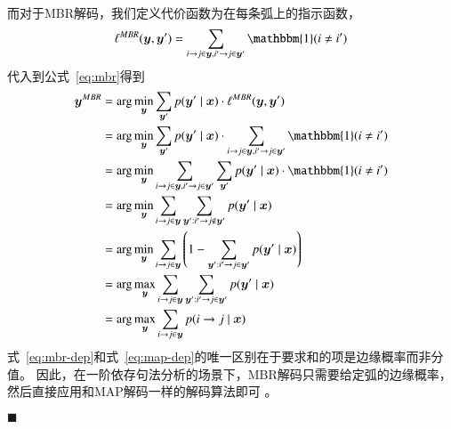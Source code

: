 而对于MBR解码，我们定义代价函数为在每条弧上的指示函数，
\begin{equation}
	\ell^{MBR}(\boldsymbol{y},\boldsymbol{y}^{\prime}) = \sum_{i\rightarrow j\in\boldsymbol{y},i^{\prime}\rightarrow j\in\boldsymbol{y}^{\prime}}\mathbbm{1}(i\neq i^{\prime})
\end{equation}
代入到公式~\ref{eq:mbr}得到
\begin{equation}
	\label{eq:mbr-dep}
	\begin{split}
		\boldsymbol{y}^{MBR}&= \arg\min_{\boldsymbol{y}}\sum_{\boldsymbol{y}^{\prime}}p(\boldsymbol{y}^{\prime}\mid\boldsymbol{x})\cdot\ell^{MBR}(\boldsymbol{y},\boldsymbol{y}^{\prime})\\
		&=\arg\min_{\boldsymbol{y}}\sum_{\boldsymbol{y}^{\prime}}p(\boldsymbol{y}^{\prime}\mid\boldsymbol{x})\cdot\sum_{i\rightarrow j\in\boldsymbol{y},i^{\prime}\rightarrow j\in\boldsymbol{y}^{\prime}}\mathbbm{1}(i\neq i^{\prime})\\
		&=\arg\min_{\boldsymbol{y}}\sum_{i\rightarrow j\in\boldsymbol{y},i^{\prime}\rightarrow j\in\boldsymbol{y}^{\prime}}\sum_{\boldsymbol{y}^{\prime}}p(\boldsymbol{y}^{\prime}\mid\boldsymbol{x})\cdot\mathbbm{1}(i\neq i^{\prime})\\
		&=\arg\min_{\boldsymbol{y}}\sum_{i\rightarrow j\in\boldsymbol{y}}\sum_{\boldsymbol{y}^{\prime}:i^{\prime}\rightarrow j\notin \boldsymbol{y}^{\prime}}p(\boldsymbol{y}^{\prime}\mid\boldsymbol{x})\\
		&=\arg\min_{\boldsymbol{y}}\sum_{i\rightarrow j\in\boldsymbol{y}}\left(1-\sum_{\boldsymbol{y}^{\prime}:i^{\prime}\rightarrow j\in \boldsymbol{y}^{\prime}}p(\boldsymbol{y}^{\prime}\mid\boldsymbol{x})\right)\\
		&=\arg\max_{\boldsymbol{y}}\sum_{i\rightarrow j\in\boldsymbol{y}}\sum_{\boldsymbol{y}^{\prime}:i^{\prime}\rightarrow j\in \boldsymbol{y}^{\prime}}p(\boldsymbol{y}^{\prime}\mid\boldsymbol{x})\\
		&=\arg\max_{\boldsymbol{y}}\sum_{i\rightarrow j\in\boldsymbol{y}}p(i\rightarrow j\mid\boldsymbol{x})
	\end{split}
\end{equation}
式~\ref{eq:mbr-dep}和式~\ref{eq:map-dep}的唯一区别在于要求和的项是边缘概率而非分值。
因此，在一阶依存句法分析的场景下，MBR解码只需要给定弧的边缘概率，然后直接应用和MAP解码一样的解码算法即可 \citep{smith-smith-2007-probabilistic, smith-2011-linguistic}。

\noindent$\blacksquare$

